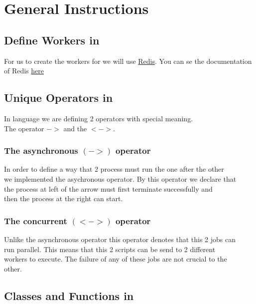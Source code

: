 \section{General Instructions}
\label{sect:general}

\subsection*{Define Workers in \lang{}}
For us to create the workers for \lang{} we will use \href{http://www.redis.io}{Redis}.
You can se the documentation of Redis \href{http://redis.io/documentation}{here}
\subsection*{Unique Operators in \lang{}}

In \lang{} language we are defining 2 operators with special meaning.\\
The operator $->$ and the $<->$.
\subsubsection*{The asynchronous $(->)$ operator}
In order to define a way that 2 process must run the one after the other\\
we implemented the asychronous operator. By this operator we declare that\\
the process at left of the arrow must first terminate successfully and\\
then the process at the right can start.
\subsubsection*{The concurrent $(<->)$ operator}
Unlike the asynchronous operator this operator denotes that this 2 jobs can\\
run parallel. This means that this 2 scripts can be send to 2 different\\
workers to execute. The failure of any of these jobs are not crucial to the\\
other.
\subsection*{Classes and Functions in \lang{}}
